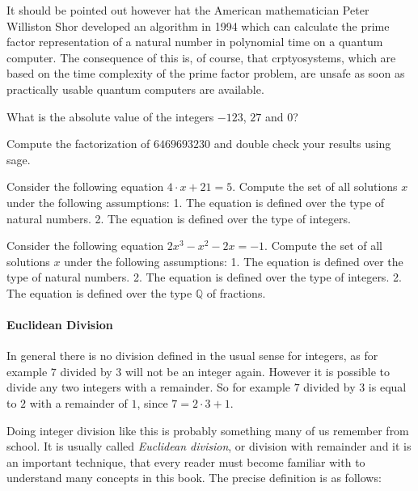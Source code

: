 It should be pointed out however hat the American mathematician Peter Williston Shor developed an algorithm in 1994 which can calculate the prime factor representation of a natural number in polynomial time on a quantum computer. The consequence of this is, of course, that crptyosystems, which are based on the time complexity of the prime factor problem, are unsafe as soon as practically usable quantum computers are available.
\begin{exercise}
What is the absolute value of the integers $-123$, $27$ and $0$?
\end{exercise}
\begin{exercise}
Compute the factorization of $6469693230$ and double check your results using sage.
\end{exercise}
\begin{exercise}
Consider the following equation $4\cdot x + 21 = 5$. Compute the set of all solutions $x$ under the following assumptions: 1. The equation is defined over the type of natural numbers. 2. The equation is defined over the type of integers.
\end{exercise}
\begin{exercise}
Consider the following equation $2 x^3 - x^2 - 2 x = - 1$. Compute the set of all solutions $x$ under the following assumptions: 1. The equation is defined over the type of natural numbers. 2. The equation is defined over the type of integers. 2. The equation is defined over the type $\mathbb{Q}$ of fractions.
\end{exercise}

\paragraph{Euclidean Division}
\label{Euclidean_division}
In general there is no division defined in the usual sense for integers, as for example $7$ divided by $3$ will not be an integer again. However it is possible to divide any two integers with a remainder. So for example $7$ divided by $3$ is equal to $2$ with a remainder of $1$, since $7 = 2\cdot 3 + 1$. 

Doing integer division like this is probably something many of us remember from school. It is 
usually called \textit{Euclidean division}, or division with remainder and it is an important technique, that every reader must become familiar with to understand many concepts in this book. The precise definition is as follows:

